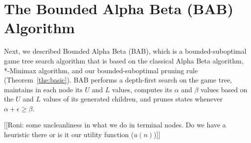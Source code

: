 \documentclass[letterpaper]{article} %
\newtheorem{theorem}{Theorem}
\newcommand{\MM}{\mathit{V}}
\newcommand{\pess}{\mathit{L}}
\newcommand{\opti}{\mathit{U}}
\newcommand{\rootnode}{\mathit{root}}
\begin{document}






\section{The Bounded Alpha Beta (BAB) Algorithm}

Next, we described Bounded Alpha Beta (BAB), which is a bounded-suboptimal game tree search algorithm 
that is based on the classical Alpha Beta algorithm, *-Minimax algorithm, and our bounded-suboptimal pruning rule (Theorem~\ref{the:basic}). 
BAB performs a depth-first search on the game tree, maintains in each node its $\opti$ and $\pess$ values, computes its $\alpha$ and $\beta$ values based on the $\opti$ and $\pess$ values of its generated children, and prunes states whenever $\alpha+\epsilon\geq \beta$. 


[[Roni: some uncleanliness in what we do in terminal nodes. Do we have a heuristic there or is it our utility function ($u(n)$)]]
\end{document}

